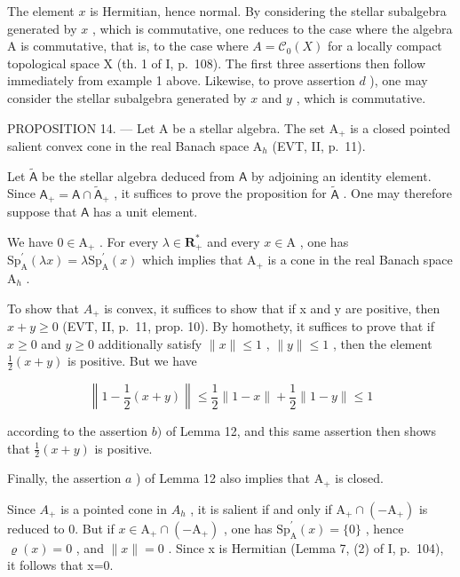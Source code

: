 The element \(x\) is Hermitian, hence normal. By considering the stellar subalgebra generated by \(x\) , which is commutative, one reduces to the case where the algebra A is commutative, that is, to the case where \(A = \mathcal{C}_0(X)\) for a locally compact topological space X (th. 1 of I, p.~108). The first three assertions then follow immediately from example 1 above. Likewise, to prove assertion \(d\) ), one may consider the stellar subalgebra generated by \(x\) and \(y\) , which is commutative.

PROPOSITION 14. --- Let A be a stellar algebra. The set \(\mathrm{A}_{+}\) is a closed pointed salient convex cone in the real Banach space \(\mathrm{A}_{h}\) (EVT, II, p.~11).

Let \(\widetilde{\mathsf{A}}\) be the stellar algebra deduced from \(\mathsf{A}\) by adjoining an identity element. Since \(\mathsf{A}_{+} = \mathsf{A} \cap \widetilde{\mathsf{A}}_{+}\) , it suffices to prove the proposition for \(\widetilde{\mathsf{A}}\) . One may therefore suppose that \(\mathsf{A}\) has a unit element.

We have \(0 \in \mathrm{A}_{+}\) . For every \(\lambda \in \mathbf{R}_{+}^{*}\) and every \(x \in \mathrm{A}\) , one has \(\mathrm{Sp}_{\mathrm{A}}^{\prime}(\lambda x) = \lambda \mathrm{Sp}_{\mathrm{A}}^{\prime}(x)\) which implies that \(\mathrm{A}_{+}\) is a cone in the real Banach space \(\mathrm{A}_{h}\) .

To show that \(A_{+}\) is convex, it suffices to show that if x and y are positive, then \(x + y \geqslant 0\) (EVT, II, p.~11, prop. 10). By homothety, it suffices to prove that if \(x \geqslant 0\) and \(y \geqslant 0\) additionally satisfy \(\|x\| \leqslant 1\) , \(\|y\| \leqslant 1\) , then the element \(\frac{1}{2}(x + y)\) is positive. But we have

\[
\left\| 1 - \frac {1}{2} (x + y) \right\| \leqslant \frac {1}{2} \| 1 - x \| + \frac {1}{2} \| 1 - y \| \leqslant 1
\]

according to the assertion \(b)\) of Lemma 12, and this same assertion then shows that \(\frac{1}{2}(x + y)\) is positive.

Finally, the assertion \(a\) ) of Lemma 12 also implies that \(\mathrm{A}_{+}\) is closed.

Since \(A_{+}\) is a pointed cone in \(A_{h}\) , it is salient if and only if \(\mathrm{A}_{+}\cap(-\mathrm{A}_{+})\) is reduced to 0. But if \(x\in\mathrm{A}_{+}\cap(-\mathrm{A}_{+})\) , one has \(\mathrm{Sp}_{\mathrm{A}}^{\prime}(x)=\{0\}\) , hence \(\varrho(x)=0\) , and \(\|x\|=0\) . Since x is Hermitian (Lemma 7, (2) of I, p.~104), it follows that x=0.

